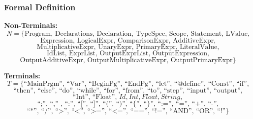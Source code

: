 \documentclass[12pt,a4paper]{article}
\begin{document}
\subsubsection*{Formal Definition}

\noindent\textbf{Non-Terminals:}
\[
	N = \{
	\text{Program, Declarations, Declaration, TypeSpec, Scope, Statement, LValue,}
\]
\[
	\text{Expression, LogicalExpr, ComparisonExpr, AdditiveExpr,}
\]
\[
	\text{MultiplicativeExpr, UnaryExpr, PrimaryExpr, LiteralValue,}
\]
\[
	\text{IdList, ExprList, OutputExprList, OutputExpression,}
\]
\[
	\text{OutputAdditiveExpr, OutputMultiplicativeExpr, OutputPrimaryExpr}
	\}
\]

\noindent\textbf{Terminals:}
\[
	T = \{
	\text{``MainPrgm'', ``Var'', ``BeginPg'', ``EndPg'', ``let'', ``@define'', ``Const'', ``if'',}
\]
\[
	\text{``then'', ``else'', ``do'', ``while'', ``for'', ``from'', ``to'', ``step'', ``input'', ``output'',}
\]
\[
	\text{``Int'', ``Float'', } \mathit{Id}, \mathit{Int}, \mathit{Float}, \mathit{String},
\]
\[
	\text{``;'', ``,'' , ``:'', ``['', ``]'', ``('', ``)'', ``\{'', ``\}'', ``:='', ``='', ``+'', ``-'',}
\]
\[
	\text{``*'', ``/'', ``>'', ``<'', ``>='', ``<='', ``=='', ``!='', ``AND'', ``OR'', ``!''}
	\}
\]
\end{document}
